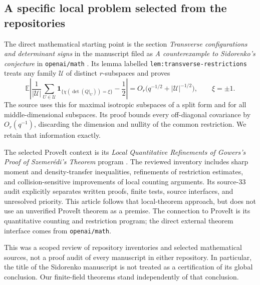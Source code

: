 \documentclass[11pt,a4paper]{article}
\theoremstyle{definition}
\theoremstyle{remark}
\newcommand{\E}{\mathbb E}
\newcommand{\one}{\mathbf 1}
\newcommand{\abs}[1]{\left|#1\right|}
\begin{document}
\subsection{A specific local problem selected from the repositories}
The direct mathematical starting point is the section \emph{Transverse
configurations and determinant signs} in the manuscript filed as
\emph{A counterexample to Sidorenko's conjecture} in \texttt{openai/math}
\cite{openai}. Its lemma labelled \texttt{lem:transverse-restrictions} treats
any family $\mathcal U$ of distinct $r$-subspaces and proves
\begin{equation}\label{eq:source-bound}
 \E\abs{\frac1{|\mathcal U|}\sum_{U\in\mathcal U}
 \one_{\{\chi(\det(Q|_U))=\xi\}}-\frac12}
 =O_r\bigl(q^{-1/2}+|\mathcal U|^{-1/2}\bigr),\qquad \xi=\pm1.
\end{equation}
The source uses this for maximal isotropic subspaces of a split form and for
all middle-dimensional subspaces. Its proof bounds every off-diagonal
covariance by $O_r(q^{-1})$, discarding the dimension and nullity of the common
restriction. We retain that information exactly.

The selected ProveIt context is its \emph{Local Quantitative Refinements of
Gowers's Proof of Szemer\'edi's Theorem} program \cite{proveit}. The reviewed
inventory includes sharp moment and density-transfer inequalities, refinements
of restriction estimates, and collision-sensitive improvements of local
counting arguments. Its source-33 audit explicitly separates written proofs,
finite tests, source interfaces, and unresolved priority. This article follows
that local-theorem approach, but does not use an unverified ProveIt theorem as
a premise. The connection to ProveIt is its quantitative counting and
restriction program; the direct external theorem interface comes from
\texttt{openai/math}.

This was a scoped review of repository inventories and selected mathematical
sources, not a proof audit of every manuscript in either repository. In
particular, the title of the Sidorenko manuscript is not treated as a
certification of its global conclusion. Our finite-field theorems stand
independently of that conclusion.
\end{document}
